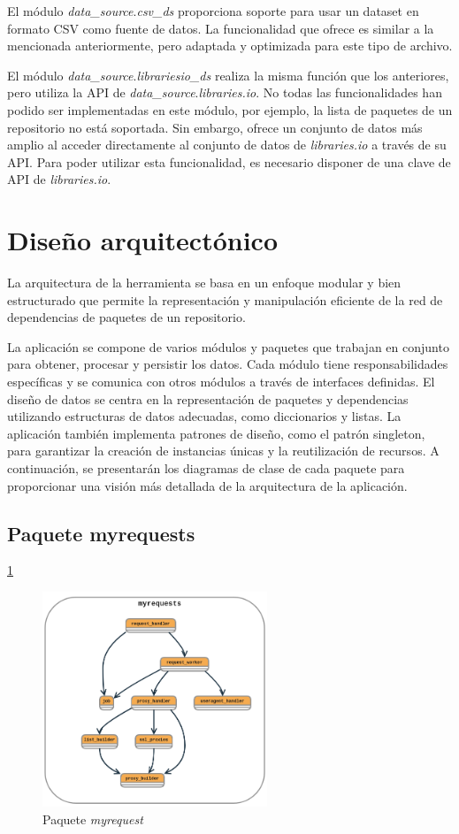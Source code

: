 El módulo \textit{data\_source}.\textit{csv\_ds} proporciona soporte para usar un dataset en formato CSV como fuente de
datos. La funcionalidad que ofrece es similar a la mencionada anteriormente, pero adaptada y optimizada
para este tipo de archivo.

El módulo \textit{data\_source}.\textit{librariesio\_ds} realiza la misma función que los anteriores, pero utiliza la
API de \textit{data\_source}.\textit{libraries.io}. No todas las funcionalidades han podido ser implementadas en este
módulo, por ejemplo, la lista de paquetes de un repositorio no está soportada. Sin embargo, ofrece
un conjunto de datos más amplio al acceder directamente al conjunto de datos de \textit{libraries.io}
a través de su API. Para poder utilizar esta funcionalidad, es necesario disponer de una clave de API
de \textit{libraries.io}.

\section{Diseño arquitectónico}

La arquitectura de la herramienta se basa en un enfoque modular y bien estructurado que permite la
representación y manipulación eficiente de la red de dependencias de paquetes de un repositorio. 

La aplicación se compone de varios módulos y paquetes que trabajan en conjunto para obtener, procesar y persistir los datos.
Cada módulo tiene responsabilidades específicas y se comunica con otros módulos a través de interfaces definidas.
El diseño de datos se centra en la representación de paquetes y dependencias utilizando estructuras de datos
adecuadas, como diccionarios y listas. La aplicación también implementa patrones de diseño, como el patrón singleton,
para garantizar la creación de instancias únicas y la reutilización de recursos. A continuación, se presentarán
los diagramas de clase de cada paquete para proporcionar una visión más detallada de la arquitectura de
la aplicación.


\subsection{Paquete myrequests} \ref{fig:myrequests}

\begin{figure}[h!]
    \centering
    \includegraphics[width=0.6\textwidth]{img/anexos/myrequest.png}
    \caption{Paquete \textit{myrequest}}
    \label{fig:myrequests}
\end{figure}


